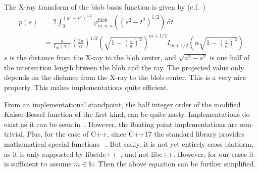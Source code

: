 The X-ray transform of the blob basis function is given by
(c.f.~\cite{lewitt_multidimensional_1990,lewitt_alternatives_1992})
\begin{align}\label{eq:radon_blob_basis}
	p(s) & = 2 \int_0^{(a^2-s^2)^{1 / 2}} \varphi^{\text{blob}}_{m, \alpha, a}\left(\left(s^2 - t^2\right)^{1/2}\right) \, \mathrm{d} t                                                                        \\
	     & = \frac{a}{I_m(\alpha)} \left( \frac{2\pi}{\alpha}\right)^{1/2} \left( \sqrt{1 - \left(\frac{s}{a}\right)^2} \right)^{m + 1/2} I_{m+1/2}\left( \alpha \sqrt{1 - \left(\frac{s}{a}\right)^2} \right)
\end{align}
\(s\) is the distance from the X-ray to the blob center, and \(\sqrt{a^2 - s^2}\) is one half of the
intersection length btween the blob and the ray. The projected value only depends on the distance
from the X-ray to the blob center. This is a very nice property. This makes implementations quite
efficient.


From an implementational standpoint, the half integer order of the modified Kaiser-Bessel function
of the first kind, can be quite nasty. Implementations do exist as it can be seen
in~\cite{temme_numerical_1975}. However, the floating point implementations are non-trivial. Plus,
for the case of C++, since C++17 the standard library provides mathematical special functions
~\cite{noauthor_c_nodate, noauthor_stdcyl_bessel_i_nodate}. But sadly, it is not yet entirely
cross platform, as it is only supported by libstdc++~\cite{noauthor_libstdc_nodate-1}, and not
libc++. However, for our cases it is sufficient to assume \(m \in \mathbb{N}\). Then the above
equation can be further simplified.

